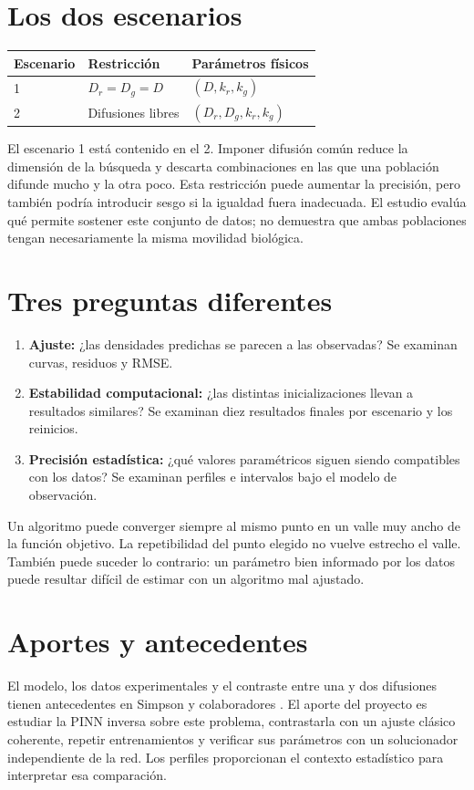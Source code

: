 \documentclass[11pt,a4paper]{report}
\begin{document}
\section{Los dos escenarios}
\begin{center}
\begin{tabular}{lll}\toprule
Escenario & Restricción & Parámetros físicos\\\midrule
1 & $D_r=D_g=D$ & $(D,k_r,k_g)$\\
2 & Difusiones libres & $(D_r,D_g,k_r,k_g)$\\\bottomrule
\end{tabular}
\end{center}
El escenario 1 está contenido en el 2. Imponer difusión común reduce la dimensión de la búsqueda y descarta combinaciones en las que una población difunde mucho y la otra poco. Esta restricción puede aumentar la precisión, pero también podría introducir sesgo si la igualdad fuera inadecuada. El estudio evalúa qué permite sostener este conjunto de datos; no demuestra que ambas poblaciones tengan necesariamente la misma movilidad biológica.

\section{Tres preguntas diferentes}
\begin{enumerate}
\item \textbf{Ajuste:} ¿las densidades predichas se parecen a las observadas? Se examinan curvas, residuos y RMSE.
\item \textbf{Estabilidad computacional:} ¿las distintas inicializaciones llevan a resultados similares? Se examinan diez resultados finales por escenario y los reinicios.
\item \textbf{Precisión estadística:} ¿qué valores paramétricos siguen siendo compatibles con los datos? Se examinan perfiles e intervalos bajo el modelo de observación.
\end{enumerate}
Un algoritmo puede converger siempre al mismo punto en un valle muy ancho de la función objetivo. La repetibilidad del punto elegido no vuelve estrecho el valle. También puede suceder lo contrario: un parámetro bien informado por los datos puede resultar difícil de estimar con un algoritmo mal ajustado.

\section{Aportes y antecedentes}
El modelo, los datos experimentales y el contraste entre una y dos difusiones tienen antecedentes en Simpson y colaboradores \cite{simpson}. El aporte del proyecto es estudiar la PINN inversa sobre este problema, contrastarla con un ajuste clásico coherente, repetir entrenamientos y verificar sus parámetros con un solucionador independiente de la red. Los perfiles proporcionan el contexto estadístico para interpretar esa comparación.
\end{document}
